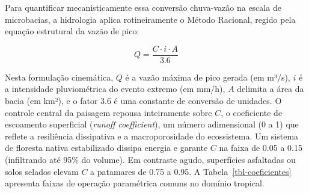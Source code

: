 \documentclass[
  portuguese,
  11pt,
  a4paper,
  open=any]{scrbook}
\begin{document}
Para quantificar mecanisticamente essa conversão chuva-vazão na escala
de microbacias, a hidrologia aplica rotineiramente o Método Racional,
regido pela equação estrutural da vazão de pico:

\[
Q = \frac{C \cdot i \cdot A}{3.6}
\]

Nesta formulação cinemática, \(Q\) é a vazão máxima de pico gerada (em
m³/s), \(i\) é a intensidade pluviométrica do evento extremo (em mm/h),
\(A\) delimita a área da bacia (em km²), e o fator \(3.6\) é uma
constante de conversão de unidades. O controle central da paisagem
repousa inteiramente sobre \(C\), o coeficiente de escoamento
superficial (\emph{runoff coefficient}), um número adimensional (0 a 1)
que reflete a resiliência dissipativa e a macroporosidade do
ecossistema. Um sistema de floresta nativa estabilizado dissipa energia
e garante \(C\) na faixa de 0.05 a 0.15 (infiltrando até 95\% do
volume). Em contraste agudo, superfícies asfaltadas ou solos selados
elevam \(C\) a patamares de 0.75 a 0.95. A Tabela~\ref{tbl-coeficientes}
apresenta faixas de operação paramétrica comuns no domínio tropical.
\end{document}
